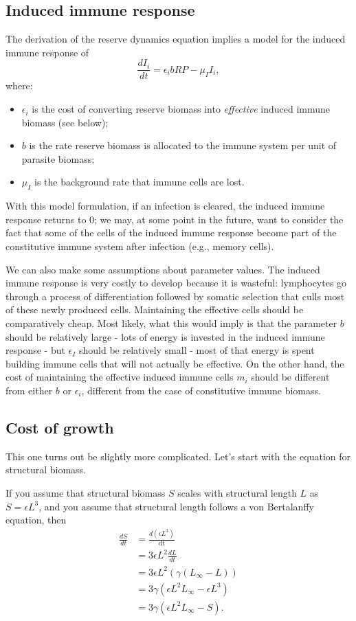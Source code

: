 \documentclass[11pt,reqno,final,pdftex]{amsart}\usepackage[]{graphicx}\usepackage[]{color}
\theoremstyle{plain}
\numberwithin{equation}{part}
\begin{document}
\subsection*{ Induced immune response}
The derivation of the reserve dynamics equation implies a model for the induced immune response of
\begin{equation}
\frac{dI_i}{dt}=\epsilon _ib R P-\mu _II_i,
\end{equation}
where:
\begin{itemize}
\item $\epsilon _i$ is the cost of converting reserve biomass into \textit{ effective }induced immune biomass (see below);
\item $b$ is the rate reserve biomass is allocated to the immune system per unit of parasite biomass;
\item $\mu _I$ is the background rate that immune cells are lost.
\end{itemize}

With this model formulation, if an infection is cleared, the induced immune response returns to 0; we may, at some point in the future, want to consider the fact that some of the cells of the induced immune response become part of the constitutive immune system after infection (e.g., memory cells).

We can also make some assumptions about parameter values.
The induced immune response is very costly to develop because it is wasteful: lymphocytes go through a process of differentiation followed by somatic selection that culls most of these newly produced cells.
Maintaining the effective cells should be comparatively cheap.
Most likely, what this would imply is that the parameter $b$ should be relatively large - lots of energy is invested in the induced immune response - but $\epsilon _I$ should be relatively small - most of that energy is spent building immune cells that will not actually be effective.
On the other hand, the cost of maintaining the effective induced immune cells $m_i$ should be different from either $b$ or $\epsilon_i$, different from the case of constitutive immune biomass.

\subsection*{Cost of growth}
This one turns out be slightly more complicated.
Let's start with the equation for structural biomass.

If you assume that structural biomass $S$ scales with structural length $L$ as $S =\epsilon L^3$, and you assume that structural length
follows a von Bertalanffy equation, then
\begin{align}
\frac{dS}{dt} &=\frac{d\left(\epsilon  L^3\right)}{\text{dt}} \\
& =3\epsilon  L^2 \frac{dL}{dt} \\
& =3 \epsilon  L^2 \left(\gamma \left(L_{\infty}-L\right)\right) \\
& =3 \gamma \left(\epsilon  L^2 L_{\infty}-\epsilon  L^3\right) \\
& =3 \gamma \left(\epsilon  L^2L_{\infty }-S\right).
\end{align}
\end{document}
